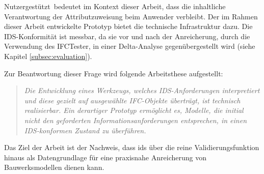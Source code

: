 \glqq Nutzergestützt\grqq\ bedeutet im Kontext dieser Arbeit, dass die inhaltliche Verantwortung 
der Attributzuweisung beim Anwender verbleibt. Der im Rahmen dieser Arbeit entwickelte Prototyp 
bietet die technische Infrastruktur dazu. 
Die IDS-Konformität ist messbar, da sie vor und nach der Anreicherung, durch die Verwendung des \glqq IFCTester\grqq, in einer 
Delta-Analyse gegenübergestellt wird (siehe Kapitel \ref{subsec:evaluation}).

Zur Beantwortung dieser Frage wird folgende Arbeitsthese aufgestellt:

\begin{quote}
    \textit{Die Entwicklung eines Werkzeugs, welches IDS-Anforderungen interpretiert und diese 
    gezielt auf ausgewählte IFC-Objekte überträgt, ist technisch realisierbar. Ein derartiger 
    Prototyp ermöglicht es, Modelle, die initial nicht den geforderten Informationsanforderungen 
    entsprechen, in einen IDS-konformen Zustand zu überführen.}
\end{quote}

Das Ziel der Arbeit ist der Nachweis, dass \gls{ids} über die reine Validierungsfunktion hinaus als 
Datengrundlage für eine praxisnahe Anreicherung von Bauwerksmodellen dienen kann.

